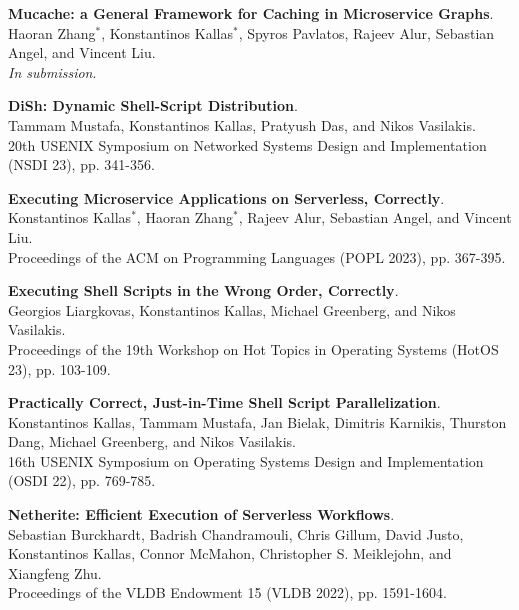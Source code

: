 \begin{minipage}{\textwidth}
\textbf{Mucache: a General Framework for Caching in Microservice Graphs}. \\
Haoran Zhang$^*$, Konstantinos Kallas$^*$, Spyros Pavlatos, Rajeev Alur, Sebastian Angel, and Vincent Liu. \\
\emph{In submission}.
\end{minipage}

\begin{minipage}{\textwidth}
\textbf{DiSh: Dynamic Shell-Script Distribution}. \\
Tammam Mustafa, Konstantinos Kallas, Pratyush Das, and Nikos Vasilakis. \\
20th USENIX Symposium on Networked Systems Design and Implementation (NSDI 23), pp. 341-356.
\end{minipage}

\begin{minipage}{\textwidth}
\textbf{Executing Microservice Applications on Serverless, Correctly}. \\
Konstantinos Kallas$^*$, Haoran Zhang$^*$, Rajeev Alur, Sebastian Angel, and Vincent Liu. \\
Proceedings of the ACM on Programming Languages (POPL 2023), pp. 367-395.
\end{minipage}

\begin{minipage}{\textwidth}
\textbf{Executing Shell Scripts in the Wrong Order, Correctly}. \\
Georgios Liargkovas, Konstantinos Kallas, Michael Greenberg, and Nikos Vasilakis. \\
Proceedings of the 19th Workshop on Hot Topics in Operating Systems (HotOS 23), pp. 103-109.
\end{minipage}

\begin{minipage}{\textwidth}
\textbf{Practically Correct, Just-in-Time Shell Script Parallelization}. \\
Konstantinos Kallas, Tammam Mustafa, Jan Bielak, Dimitris Karnikis, Thurston Dang, Michael Greenberg, and Nikos Vasilakis. \\
16th USENIX Symposium on Operating Systems Design and Implementation (OSDI 22), pp. 769-785.
\end{minipage}

\begin{minipage}{\textwidth}
\textbf{Netherite: Efficient Execution of Serverless Workflows}. \\
Sebastian Burckhardt, Badrish Chandramouli, Chris Gillum, David Justo, Konstantinos Kallas, Connor McMahon, Christopher S. Meiklejohn, and Xiangfeng Zhu. \\
Proceedings of the VLDB Endowment 15 (VLDB 2022), pp. 1591-1604.
\end{minipage}

